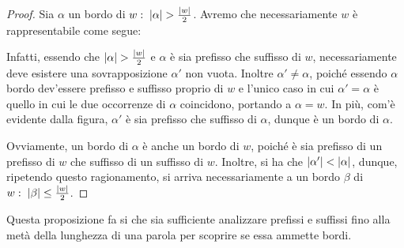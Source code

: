 \begin{proof}
  Sia \(\alpha\) un bordo di \(w :\; \left|\alpha\right| > \frac{\left|w\right|}{2}\).
  Avremo che necessariamente \(w\) è rappresentabile come segue:
  \begin{figure}[H]
    \centering
  \end{figure}
  Infatti, essendo che \(\left|\alpha\right| > \frac{\left|w\right|}{2}\) e \(\alpha\) è sia prefisso che suffisso di \(w\), necessariamente deve esistere una sovrapposizione \(\alpha'\) non vuota.
  Inoltre \(\alpha'\neq\alpha\), poiché essendo \(\alpha\) bordo dev'essere prefisso e suffisso proprio di \(w\) e l'unico caso in cui \(\alpha' = \alpha\) è quello in cui le due occorrenze di \(\alpha\) coincidono, portando a \(\alpha = w\).
  In più, com'è evidente dalla figura, \(\alpha'\) è sia prefisso che suffisso di \(\alpha\), dunque è un bordo di \(\alpha\).

  Ovviamente, un bordo di \(\alpha\) è anche un bordo di \(w\), poiché è sia prefisso di un prefisso di \(w\) che suffisso di un suffisso di \(w\).
  Inoltre, si ha che \(\left|\alpha'\right| < \left|\alpha\right|\), dunque, ripetendo questo ragionamento, si arriva necessariamente a un bordo \(\beta\) di \(w :\; \left|\beta\right| \leq \frac{\left|w\right|}{2}\).
\end{proof}

Questa proposizione fa si che sia sufficiente analizzare prefissi e suffissi fino alla metà della lunghezza di una parola per scoprire se essa ammette bordi.

